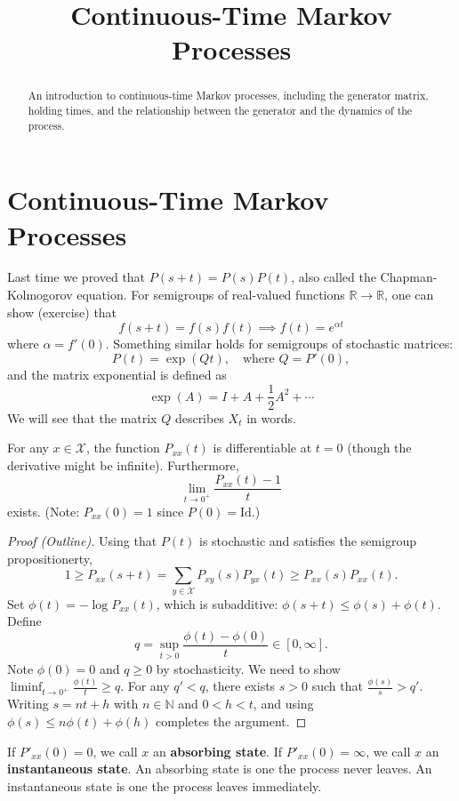 \documentclass{ximera}
\title{Continuous-Time Markov Processes}
\begin{document}
\begin{abstract}
An introduction to continuous-time Markov processes, including the generator matrix, holding times, and the relationship between the generator and the dynamics of the process.
\end{abstract}
\maketitle

\section*{Continuous-Time Markov Processes}

Last time we proved that $P(s+t) = P(s)P(t)$, also called the Chapman-Kolmogorov equation. For semigroups of real-valued functions $\mathbb{R} \to \mathbb{R}$, one can show (exercise) that
\[
f(s+t) = f(s)f(t) \implies f(t) = e^{\alpha t}
\]
where $\alpha = f'(0)$. Something similar holds for semigroups of stochastic matrices:
\[
P(t) = \exp(Qt), \quad \text{where } Q = P'(0),
\]
and the matrix exponential is defined as
\[
\exp(A) = I + A + \frac{1}{2}A^2 + \cdots
\]
We will see that the matrix $Q$ describes $X_t$ in words.

\begin{theorem}
For any $x \in \mathcal{X}$, the function $P_{xx}(t)$ is differentiable at $t = 0$ (though the derivative might be infinite). Furthermore,
\[
\lim_{t \to 0^+} \frac{P_{xx}(t) - 1}{t}
\]
exists. (Note: $P_{xx}(0) = 1$ since $P(0) = \text{Id}$.)
\end{theorem}

\begin{proof}[Proof (Outline)]
Using that $P(t)$ is stochastic and satisfies the semigroup propositionerty,
\[
1 \geq P_{xx}(s+t) = \sum_{y \in \mathcal{X}} P_{xy}(s) P_{yx}(t) \geq P_{xx}(s) P_{xx}(t).
\]
Set $\phi(t) = -\log P_{xx}(t)$, which is subadditive: $\phi(s+t) \leq \phi(s) + \phi(t)$. Define
\[
q = \sup_{t > 0} \frac{\phi(t) - \phi(0)}{t} \in [0, \infty].
\]
Note $\phi(0) = 0$ and $q \geq 0$ by stochasticity. We need to show $\liminf_{t \to 0^+} \frac{\phi(t)}{t} \geq q$. For any $q' < q$, there exists $s > 0$ such that $\frac{\phi(s)}{s} > q'$. Writing $s = nt + h$ with $n \in \mathbb{N}$ and $0 < h < t$, and using $\phi(s) \leq n\phi(t) + \phi(h)$ completes the argument.
\end{proof}

\begin{definition}
If $P'_{xx}(0) = 0$, we call $x$ an \textbf{absorbing state}. If $P'_{xx}(0) = \infty$, we call $x$ an \textbf{instantaneous state}. An absorbing state is one the process never leaves. An instantaneous state is one the process leaves immediately.
\end{definition}
\end{document}
